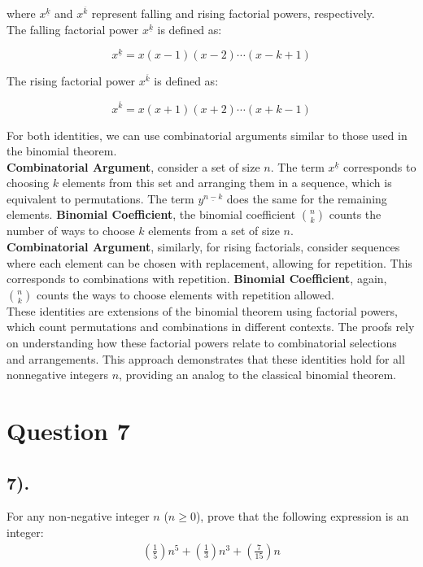 \documentclass[12pt]{article}
\begin{document}
where \(x^{\underline{k}}\) and \(x^{\overline{k}}\) represent falling and rising factorial powers, respectively. \\

The falling factorial power \(x^{\underline{k}}\) is defined as:

\[ x^{\underline{k}} = x (x - 1) (x - 2) \cdots (x - k + 1) \]

The rising factorial power \(x^{\overline{k}}\) is defined as:

\[ x^{\overline{k}} = x (x + 1) (x + 2) \cdots (x + k - 1) \]

For both identities, we can use combinatorial arguments similar to those used in the binomial theorem. \\

\textbf{Combinatorial Argument}, consider a set of size \(n\). The term \(x^{\underline{k}}\) corresponds to choosing \(k\) elements from this set and arranging them in a sequence, which is equivalent to permutations.
The term \(y^{\underline{n-k}}\) does the same for the remaining elements.
\textbf{Binomial Coefficient}, the binomial coefficient \(\binom{n}{k}\) counts the number of ways to choose \(k\) elements from a set of size \(n\). \\

\textbf{Combinatorial Argument}, similarly, for rising factorials, consider sequences where each element can be chosen with replacement, allowing for repetition. This corresponds to combinations with repetition.
\textbf{Binomial Coefficient}, again, \(\binom{n}{k}\) counts the ways to choose elements with repetition allowed. \\

These identities are extensions of the binomial theorem using factorial powers, which count permutations and combinations in different contexts. The proofs rely on understanding how these factorial powers relate to combinatorial selections and arrangements.
This approach demonstrates that these identities hold for all nonnegative integers \(n\), providing an analog to the classical binomial theorem.

\section*{Question 7}
\subsection*{7).}
For any non-negative integer $n$ ($n \geq 0$), prove that the following expression is an integer:
\begin{gather*}
    (\frac{1}{5})n^5 + (\frac{1}{3})n^3 + (\frac{7}{15})n
\end{gather*}
\end{document}
